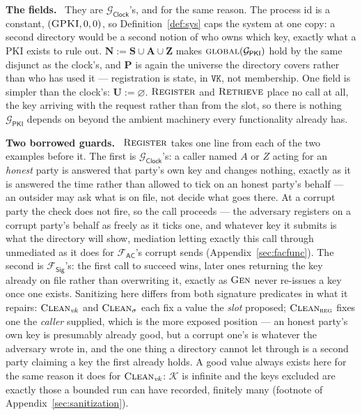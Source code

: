 \documentclass[11pt,a4paper]{article}
\newcommand{\Ps}{\mathbf{P}}
\renewcommand{\emptyset}{\varnothing}
\newcommand{\admits}{\mathbf{N}}
\newcommand{\Apid}{\mathbf{A}}
\newcommand{\Zpid}{\mathbf{Z}}
\newcommand{\Spid}{\mathbf{S}}
\newcommand{\uses}{\mathbf{U}}
\newcommand{\op}[1]{\textsc{#1}}
\newcommand{\Fsig}{\mathcal{F}_{\mathsf{Sig}}}
\newcommand{\Gclock}{\mathcal{G}_{\mathsf{Clock}}}
\newcommand{\Gpki}{\mathcal{G}_{\mathsf{PKI}}}
\newcommand{\Fac}{\mathcal{F}_{\mathsf{AC}}}
\newcommand{\vk}{\mathit{vk}}
\newcommand{\Keys}{\mathcal{K}}
\newcommand{\Clean}{\op{Clean}}
\newcommand{\V}[1]{\mathtt{#1}}
\newcommand{\heading}[1]{\medskip\par\noindent\textcolor{accent}{\textbf{#1.}}\ }
\theoremstyle{accentdef}
\theoremstyle{accentplain}
\begin{document}
\heading{The fields} They are $\Gclock$'s, and for the same reason. The process id is a constant,
$(\op{G}\op{PKI},0,0)$, so Definition~\ref{def:sys} caps the system at one copy: a second
directory would be a second notion of who owns which key, exactly what a PKI exists to rule out.
$\admits := \Spid \cup \Apid \cup \Zpid$ makes $\op{global}(\Gpki)$ hold by the same disjunct as
the clock's, and $\Ps$ is again the universe the directory covers rather than who has used it ---
registration is state, in $\V{VK}$, not membership. One field is simpler than the clock's:
$\uses := \emptyset$. $\op{Register}$ and $\op{Retrieve}$ place no call at all, the key arriving
with the request rather than from the slot, so there is nothing $\Gpki$ depends on beyond the
ambient machinery every functionality already has.

\heading{Two borrowed guards} $\op{Register}$ takes one line from each of the two examples before
it. The first is $\Gclock$'s: a caller named $A$ or $Z$ acting for an \emph{honest} party is
answered that party's own key and changes nothing, exactly as it is answered the time rather than
allowed to tick on an honest party's behalf --- an outsider may ask what is on file, not decide
what goes there. At a corrupt party the check does not fire, so the call proceeds --- the adversary
registers on a corrupt party's behalf as freely as it ticks one, and whatever key it submits is
what the directory will show, mediation letting exactly this call through unmediated as it does
for $\Fac$'s corrupt sends (Appendix~\ref{sec:facfunc}). The second is $\Fsig$'s: the first call to
succeed wins, later ones returning the key already on file rather than overwriting it, exactly as
$\op{Gen}$ never re-issues a key once one exists. Sanitizing here differs from both signature
predicates in what it repairs: $\Clean_{\vk}$ and $\Clean_{\sigma}$ each fix a value the \emph{slot}
proposed; $\Clean_{\op{reg}}$ fixes one the \emph{caller} supplied, which is the more exposed
position --- an honest party's own key is presumably already good, but a corrupt one's is whatever
the adversary wrote in, and the one thing a directory cannot let through is a second party
claiming a key the first already holds. A good value always exists here for the same reason it
does for $\Clean_{\vk}$: $\Keys$ is infinite and the keys excluded are exactly those a bounded run
can have recorded, finitely many (footnote of Appendix~\ref{sec:sanitization}).
\end{document}

